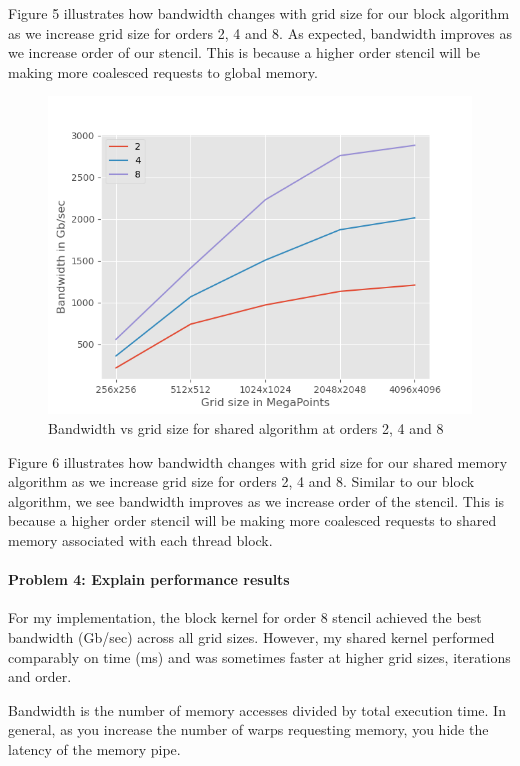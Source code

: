\documentclass[12pt,letterpaper,twoside]{article}
\begin{document}
Figure 5 illustrates how bandwidth changes with grid size for our block algorithm 
as we increase grid size for orders 2, 4 and 8. As expected, bandwidth improves 
as we increase order of our stencil. This is because a higher order stencil will 
be making more coalesced requests to global memory.

\begin{figure}[!htbp]
    \centering
    \includegraphics[scale=0.7]{bandwidth_by_order_shared.png}
    \caption{Bandwidth vs grid size for shared algorithm at orders 2, 4 and 8}
\end{figure}

Figure 6 illustrates how bandwidth changes with grid size for our shared memory
algorithm as we increase grid size for orders 2, 4 and 8. Similar to our block 
algorithm, we see bandwidth improves as we increase order of the stencil. This 
is because a higher order stencil will be making more coalesced requests to 
shared memory associated with each thread block.


\paragraph{Problem 4: Explain performance results } For my implementation, the block
kernel for order 8 stencil achieved the best bandwidth (Gb/sec) across all grid sizes.
However, my shared kernel performed comparably on time (ms) and was sometimes faster 
at higher grid sizes, iterations and order.

Bandwidth is the number of memory accesses divided by total execution time. In general, 
as you increase the number of warps requesting memory, you hide the latency of 
the memory pipe.
\end{document}

